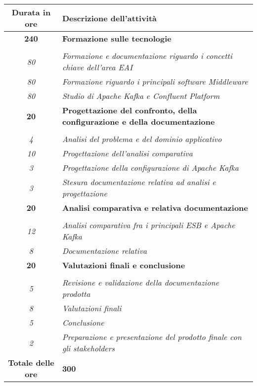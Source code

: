 

\begin{tabularx}{\textwidth}{|c|X|}
	\hline
	\textbf{Durata in ore} & \textbf{Descrizione dell'attività} \\\hline

		\textbf{240} & \textbf{Formazione sulle tecnologie} \\
		\hdashline
		\multirow{3}{0cm}\\
		\textit{80} &
		\textit{Formazione e documentazione riguardo i concetti chiave dell'area EAI} \\
		\textit{80} &
		\textit{Formazione riguardo i principali software Middleware} \\
		\textit{80} &
		\textit{Studio di Apache Kafka e Confluent Platform} \\
    \hline

    \textbf{20} & \textbf{Progettazione del confronto, della configurazione e della documentazione} \\ \hdashline
    \multirow{4}{0cm}\\
    \textit{4} &
    \textit{Analisi del problema e del dominio applicativo} \\
		\textit{10} &
		\textit{Progettazione dell'analisi comparativa} \\
    \textit{3} &
    \textit{Progettazione della configurazione di Apache Kafka} \\
    \textit{3} &
    \textit{Stesura documentazione relativa ad analisi e progettazione} \\
    \hline

		\textbf{20} & \textbf{Analisi comparativa e relativa documentazione}  \\ \hdashline
    \multirow{4}{0cm}\\
		\textit{12} &
		\textit{Analisi comparativa fra i principali ESB e Apache Kafka} \\
    \textit{8} &
    \textit{Documentazione relativa} \\
    \hline

    \textbf{20} & \textbf{Valutazioni finali e conclusione}  \\ \hdashline
    \multirow{4}{0cm}\\
		\textit{5} &
		\textit{Revisione e validazione della documentazione prodotta} \\
    \textit{8} &
    \textit{Valutazioni finali} \\
    \textit{5} &
    \textit{Conclusione} \\
    \textit{2} &
    \textit{Preparazione e presentazione del prodotto finale con gli stakeholders} \\
    \hline

		\textbf{Totale delle ore} & \textbf{300} \\\hline


\end{tabularx}
